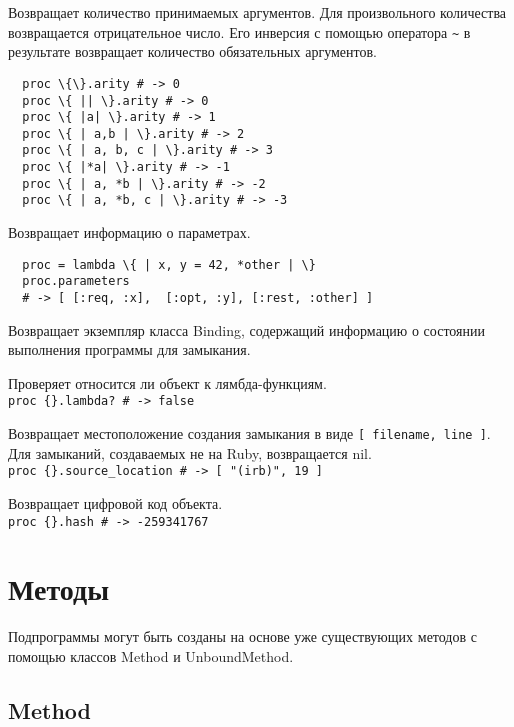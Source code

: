 \begin{methodlist}
  Возвращает количество принимаемых аргументов. Для произвольного количества возвращается отрицательное число. Его инверсия с помощью оператора \verb!~! в результате возвращает количество обязательных аргументов.
  \begin{verbatim}
  proc \{\}.arity # -> 0 
  proc \{ || \}.arity # -> 0 
  proc \{ |a| \}.arity # -> 1 
  proc \{ | a,b | \}.arity # -> 2 
  proc \{ | a, b, c | \}.arity # -> 3 
  proc \{ |*a| \}.arity # -> -1 
  proc \{ | a, *b | \}.arity # -> -2 
  proc \{ | a, *b, c | \}.arity # -> -3
  \end{verbatim} 
 
  Возвращает информацию о параметрах.
  \begin{verbatim}
  proc = lambda \{ | x, y = 42, *other | \} 
  proc.parameters
  # -> [ [:req, :x],  [:opt, :y], [:rest, :other] ]
  \end{verbatim}

  Возвращает экземпляр класса Binding, содержащий информацию о состоянии выполнения программы для замыкания.

  Проверяет относится ли объект к лямбда-функциям. 
  \\\verb!proc {}.lambda? # -> false!
 
  Возвращает местоположение создания замыкания в виде \verb![ filename, line ]!. Для замыканий, создаваемых не на Ruby, возвращается nil.
  \\\verb!proc {}.source_location # -> [ "(irb)", 19 ]!

  Возвращает цифровой код объекта. 
  \\\verb!proc {}.hash # -> -259341767!
\end{methodlist}

\section{Методы}

Подпрограммы могут быть созданы на основе уже существующих методов с помощью классов Method и UnboundMethod.

\subsection{Method}

